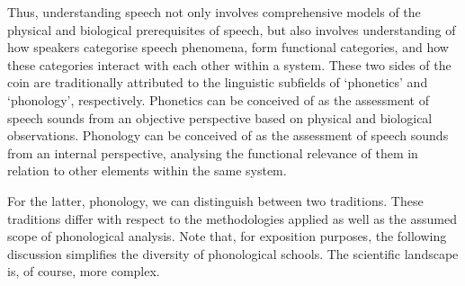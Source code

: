 Thus, understanding speech not only involves comprehensive models of the physical and biological prerequisites of speech, but also involves understanding of how speakers categorise speech phenomena, form functional categories, and how these categories interact with each other within a system. These two sides of the coin are traditionally attributed to the linguistic subfields of ‘phonetics’ and ‘phonology’, respectively. Phonetics can be conceived of as the assessment of speech sounds from an objective perspective based on physical and biological observations. Phonology can be conceived of as the assessment of speech sounds from an internal perspective, analysing the functional relevance of them in relation to other elements within the same system. 

For the latter, phonology, we can distinguish between two traditions. These traditions differ with respect to the methodologies applied as well as the assumed scope of phonological analysis. Note that, for  exposition purposes, the following discussion simplifies the diversity of phonological schools. The scientific landscape is, of course, more complex. 

